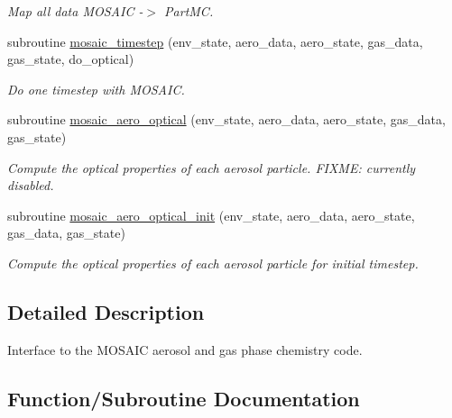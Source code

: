 \begin{DoxyCompactItemize}
\begin{DoxyCompactList}\small\item\em Map all data M\+O\+S\+A\+IC -\/$>$ Part\+MC. \end{DoxyCompactList}\item 
subroutine \mbox{\hyperlink{namespacepmc__mosaic_a6a1b2f55bf5d07b18be883ad7163d44d}{mosaic\+\_\+timestep}} (env\+\_\+state, aero\+\_\+data, aero\+\_\+state, gas\+\_\+data, gas\+\_\+state, do\+\_\+optical)
\begin{DoxyCompactList}\small\item\em Do one timestep with M\+O\+S\+A\+IC. \end{DoxyCompactList}\item 
subroutine \mbox{\hyperlink{namespacepmc__mosaic_a61a35578a797d028e4b5ee2287400a32}{mosaic\+\_\+aero\+\_\+optical}} (env\+\_\+state, aero\+\_\+data, aero\+\_\+state, gas\+\_\+data, gas\+\_\+state)
\begin{DoxyCompactList}\small\item\em Compute the optical properties of each aerosol particle. F\+I\+X\+ME\+: currently disabled. \end{DoxyCompactList}\item 
subroutine \mbox{\hyperlink{namespacepmc__mosaic_ad8eceb54892d3b14dd765db53d260d63}{mosaic\+\_\+aero\+\_\+optical\+\_\+init}} (env\+\_\+state, aero\+\_\+data, aero\+\_\+state, gas\+\_\+data, gas\+\_\+state)
\begin{DoxyCompactList}\small\item\em Compute the optical properties of each aerosol particle for initial timestep. \end{DoxyCompactList}\end{DoxyCompactItemize}


\subsection{Detailed Description}
Interface to the M\+O\+S\+A\+IC aerosol and gas phase chemistry code. 

\subsection{Function/\+Subroutine Documentation}
\mbox{\label{namespacepmc__mosaic_a61a35578a797d028e4b5ee2287400a32}} 
